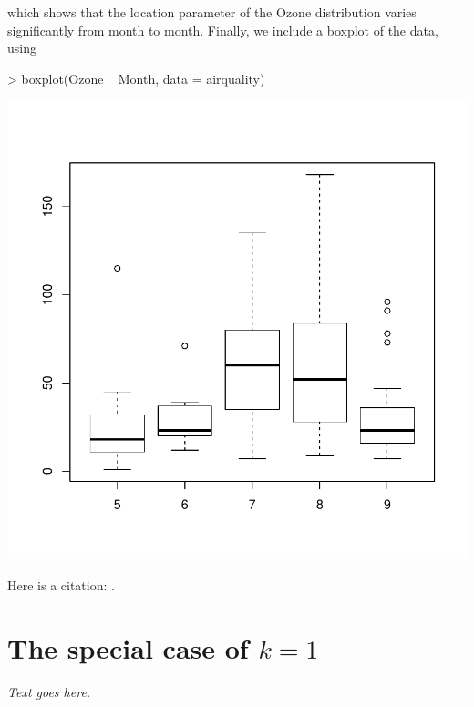 \documentclass[final]{siamart171218}
\begin{document}
which shows that the location parameter of the Ozone distribution
varies significantly from month to month. Finally, we include a
boxplot of the data, using
\begin{Schunk}
\begin{Sinput}
> boxplot(Ozone ~ Month, data = airquality)
\end{Sinput}
\end{Schunk}
\begin{center} 
\includegraphics{algorithms-003}
\end{center}

Here is a citation: \cite{lee-2001}.

\appendix

\section{The special case of $k = 1$}

{\em Text goes here.}



\end{document}
